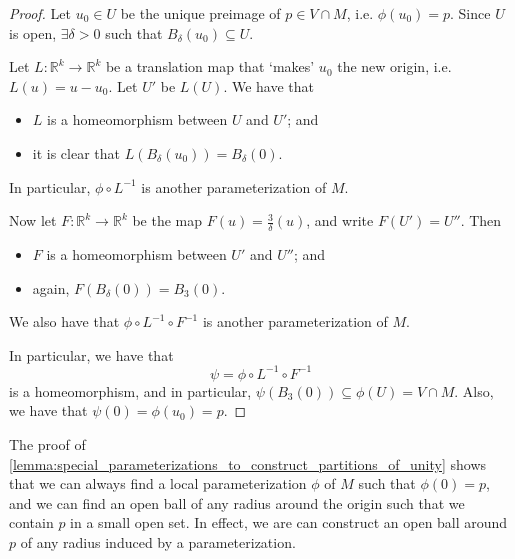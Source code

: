 \documentclass[notoc,notitlepage]{tufte-book}
\begin{document}
\begin{proof}
  Let $u_0 \in U$ be the unique preimage of $p \in V \cap M$, i.e. $\phi(u_0) =
  p$. Since $U$ is open, $\exists \delta > 0$ such that $B_{\delta}(u_0) \subseteq
  U$.

  Let $L : \mathbb{R}^k \to \mathbb{R}^k$ be a translation map that `makes'
  $u_0$ the new origin, i.e. $L(u) = u - u_0$. Let $U'$ be $L(U)$. We have that
  \begin{itemize}
    \item $L$ is a homeomorphism between $U$ and $U'$; and
    \item it is clear that $L(B_{\delta}(u_0)) = B_{\delta}(0)$.
  \end{itemize}
  In particular, $\phi \circ L^{-1}$ is another parameterization of $M$.

  Now let $F : \mathbb{R}^k \to \mathbb{R}^k$ be the map $F(u) =
  \frac{3}{\delta} (u)$, and write $F(U') = U''$. Then
   \begin{itemize}
    \item $F$ is a homeomorphism between $U'$ and $U''$; and
    \item again, $F(B_{\delta}(0)) = B_3(0)$.
  \end{itemize}
  We also have that $\phi \circ L^{-1} \circ F^{-1}$ is another parameterization
  of $M$.

  In particular,  we have that
  \begin{equation*}
    \psi = \phi \circ L^{-1} \circ F^{-1}
  \end{equation*}
  is a homeomorphism, and in particular, $\psi(B_3(0)) \subseteq \phi(U) = V
  \cap M$. Also, we have that $\psi(0) = \phi(u_0) = p$.
\end{proof}

\begin{remark}
  The proof of
  \cref{lemma:special_parameterizations_to_construct_partitions_of_unity} shows
  that we can always find a local parameterization $\phi$ of $M$ such that
  $\phi(0) = p$, and we can find an open ball of any radius around the origin
  such that we contain $p$ in a small open set. In effect, we are can construct
  an open ball around $p$ of any radius induced by a parameterization.
\end{remark}
\end{document}
